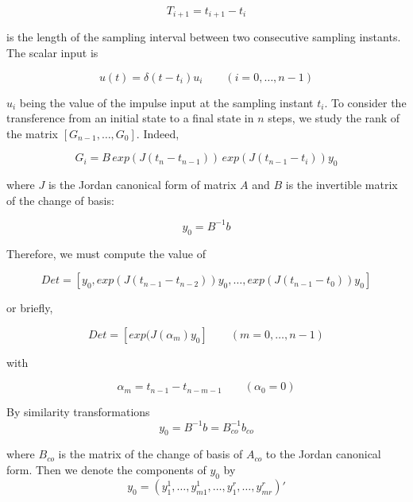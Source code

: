 \documentclass{article}
\begin{document}
\begin{equation}\label{eq:13}
T_{i+1} = t_{i+1}-t_i
\end{equation}

is the length of the sampling interval between two consecutive
sampling instants. The scalar input is

\begin{equation}\label{eq:14}
u(t) = \delta (t-t_i)u_i \qquad (i = 0, \ldots, n-1)
\end{equation}

$u_i$ being the value of the impulse input at the sampling instant
$t_i$. To consider the transference from an initial state to a
final state in $n$ steps, we study the rank of the matrix
$[G_{n-1}, \ldots , G_0]$. Indeed,

\begin{equation}\label{eq:15}
G_i = B \, exp(J(t_n - t_{n-1})) \, exp(J(t_{n-1} - t_i))y_0
\end{equation}

where $J$ is the Jordan canonical form of matrix $A$ and $B$ is
the invertible matrix of the change of basis:

\begin{equation}\label{eq:16}
y_{0} = B^{-1}b
\end{equation}

Therefore, we must compute the value of

\begin{equation}\label{eq:17}
Det = [ y_0, exp(J(t_{n-1} - t_{n-2}))y_0, \ldots, exp(J(t_{n-1} - t_0))y_0]
\end{equation}

or briefly,

\begin{equation}\label{eq:18}
Det = [ exp(J(\alpha_{m})y_0] \qquad  (m = 0, \ldots, n-1)
\end{equation}

with

\begin{equation}\label{eq:19}
\alpha_m = t_{n-1} - t_{n-m-1} \qquad (\alpha_0 = 0)
\end{equation}

By similarity transformations
\begin{equation}\label{eq:20}
y_0 = B^{-1}b = B^{-1}_{co}b_{co}
\end{equation}

where $B_{co}$ is the matrix of the change of basis of $A_{co}$ to
the Jordan canonical form. Then we denote the components of $y_0$
by
\begin{equation}\label{eq:21}
y_0 = (y_{1}^1, \ldots, y_{m1}^1, \ldots, y_{1}^r, \ldots, y_{mr}^r)'
\end{equation}
\end{document}
